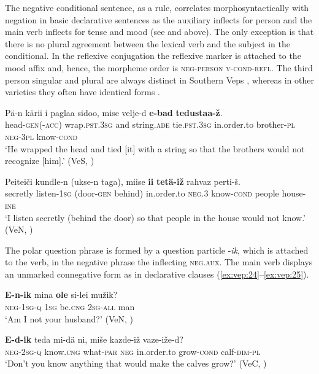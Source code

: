 \documentclass[output=paper,colorlinks=true, citecolor=brown]{langscibook}
\begin{document}
The negative conditional sentence, as a rule, correlates morphosyntactically with negation in basic declarative sentences as the auxiliary inflects for person and the main verb inflects for tense and mood (see  and  above). 
The only exception is that there is no plural agreement between the lexical verb and the subject in the conditional. In the reflexive conjugation the reflexive marker is attached to the mood affix and, hence, the morpheme order is \textsc{neg-person} \textsc{v-cond-refl}. The third person singular and plural are always distinct in Southern Veps , whereas in other varieties they often have identical forms .

\ea
    \label{ex:vep:22}
    \gll Pä-n  kärii i paglaa sidoo, mise  velje-d \textbf{e{}-bad} \textbf{tedustaa{}-ž}.\\
         head\textsc{{}-gen}(-\textsc{acc}) wrap.\textsc{pst}.\textsc{3sg}  and string.\textsc{ade} tie.\textsc{pst}.\textsc{3sg}  in.order.to brother{}-\textsc{pl} \textsc{neg{}-3pl} know\textsc{{}-cond}\\
    \glt ‘He wrapped the head and tied [it] with a string so that the brothers would not recognize [him].’ (VeS, \citealt[68]{Kettunen1920})
\z 

\ea
    \label{ex:vep:23}
    \gll Peiteiči kundle-n (ukse-n taga), miise \textbf{ii} \textbf{tetä{}-iž} rahvaz perti-š.\\
         secretly listen-\textsc{1sg} (door\textsc{{}-gen} behind) in.order.to \textsc{neg.3} know\textsc{{}-cond} people house-\textsc{ine}\\
    \glt ‘I listen secretly (behind the door) so that people in the house would not know.’ (VeN, \citealt[164]{MSFOu70})
\z

The polar question phrase is formed by a question particle {}-\textit{ik}, which is attached to the verb, in the negative phrase the inflecting \textsc{neg.aux}. The main verb displays an unmarked connegative form as in declarative clauses (\ref{ex:vep:24}–\ref{ex:vep:25}).

\ea
    \label{ex:vep:24}
    \gll \textbf{E{}-n{}-ik}  mina \textbf{ole} si{}-lei mužik?\\
         \textsc{neg-1sg-q} \textsc{1sg} be.\textsc{cng} \textsc{2sg-all} man\\
    \glt ‘Am I not your husband?’ (VeN, \citealt[155]{MSFOu70})
\z
         
{\ea
    \label{ex:vep:25}
    \gll \textbf{E{}-d{}-ik} teda mi{}-dä ni, miše kazde{}-iž vaze{}-iže{}-d? \\
         \textsc{neg{}-2sg-q} know.\textsc{cng} what-\textsc{par} \textsc{neg} in.order.to grow\textsc{{}-cond} calf-\textsc{dim{}-pl}\\
    \glt ‘Don’t you know anything that would make the calves grow?’ (VeC, \citealt[100]{MSFOu70})
\z}
\end{document}

